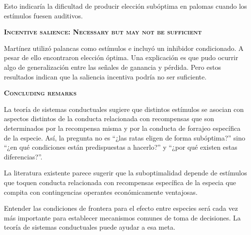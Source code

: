 \documentclass[a4paper,12pt]{article}
\begin{document}
Esto indicaría la dificultad de producir elección subóptima en palomas cuando los estímulos fuesen auditivos.

{\scshape\bfseries Incentive salience: Necessary but may not be sufficient}

Martínez utilizó palancas como estímulos e incluyó un inhibidor condicionado. A pesar de ello encontraron elección óptima. Una explicación es que pudo ocurrir algo de generalización entre las señales de ganancia y pérdida. Pero estos resultados indican que la saliencia incentiva podría no ser suficiente.

{\scshape\bfseries Concluding remarks}

La teoría de sistemas conductuales sugiere que distintos estímulos se asocian con aspectos distintos de la conducta relacionada con recompensas que son determinados por la recompensa misma y por la conducta de forrajeo específica de la especie. Así, la pregunta no es ``¿las ratas eligen de forma subóptima?'' sino ``¿en qué condiciones están predispuestas a hacerlo?'' y ``¿por qué existen estas diferencias?''.

La literatura existente parece sugerir que la suboptimalidad depende de estímulos que toquen conducta relacionada con recompensas específica de la especia que compita con contingencias operantes económicamente ventajosas.

Entender las condiciones de frontera para el efecto entre especies será cada vez más importante para establecer mecanismos comunes de toma de decisiones. La teoría de sistemas conductuales puede ayudar a esa meta.
\end{document}

